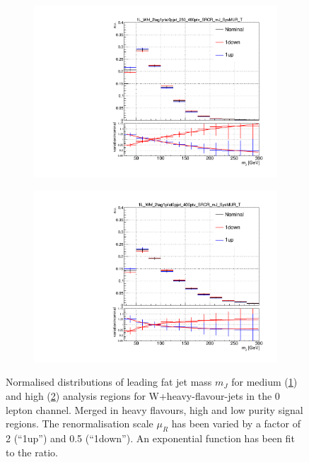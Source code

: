 \begin{figure}[!htbp]
    \centering
    \begin{subfigure}{.4\textwidth}
      \centering
      \includegraphics[width=\textwidth]{chapters/6.vhbb_boosted/figs/1L_Whf_2tag1pfat0pjet_250_400ptv_SRCR_mJ_SysMUR_T_Norm.pdf}
      \caption{}
      \label{fig:vhbb muR shape fitted sub1}
    \end{subfigure}%
    \begin{subfigure}{.4\textwidth}
      \centering
      \includegraphics[width=\textwidth]{chapters/6.vhbb_boosted/figs/1L_Whf_2tag1pfat0pjet_400ptv_SRCR_mJ_SysMUR_T_Norm.pdf}
      \caption{}
      \label{fig:vhbb muR shape fitted sub2}
    \end{subfigure}
    \vspace{-0.5em}
    \caption{Normalised distributions of leading fat jet mass $m_J$ for medium (\ref{fig:vhbb muR shape fitted sub1}) and high (\ref{fig:vhbb muR shape fitted sub2}) \pTV analysis regions for W+heavy-flavour-jets in the 0 lepton channel.
    Merged in heavy flavours, high and low purity signal regions.
    The renormalisation scale $\mu_R$ has been varied by a factor of 2 (``1up'') and 0.5 (``1down''). An exponential function has been fit to the ratio.}
    \label{fig:vhbb muR shape fitted}
\end{figure}

